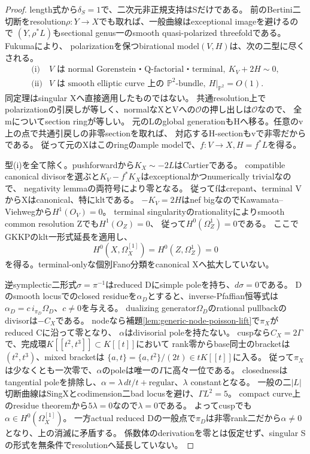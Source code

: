 \documentclass[a4paper,11pt]{ltjsarticle}
\theoremstyle{definition}
\begin{document}
\begin{proof}
length式から$\delta_S=1$で、二次元非正規支持はSだけである。
前のBertini二切断をresolution$\rho:Y\to X$でも取れば、一般曲線はexceptional imageを避けるので
$(Y,\rho^*L)$もsectional genus一のsmooth quasi-polarized threefoldである。
Fukuma\cite[Definition 1, p.75; Proposition 3(iii), p.76]{fukumag1}により、
polarizationを保つbirational model$(V,H)$は、次の二型に尽くされる。
\[
 \begin{array}{ll}
 \text{(i)}&V\text{ は normal Gorenstein・Q-factorial・terminal},\ K_V+2H\sim0,\\
 \text{(ii)}&V\text{ は smooth elliptic curve 上の }\mathbb P^2\text{-bundle},\ H|_{\mathbb P^2}=O(1).
 \end{array}
\]
同定理はsingular Xへ直接適用したものではない。
共通resolution上でpolarizationの引戻しが等しく、normalなXとVへの$\mathcal O$の押し出しは$\mathcal O$なので、
全mについてsection ringが等しい。
元のLのglobal generationもHへ移る。任意のv上の点で共通引戻しの非零sectionを取れば、
対応するH-sectionもvで非零だからである。
従って元のXはこのringのample modelで、$f:V\to X,H=f^*L$を得る。

型(i)を全て除く。pushforwardから$K_X\sim-2L$はCartierである。
compatible canonical divisorを選ぶと$K_V-f^*K_X$はexceptionalかつnumerically trivialなので、
negativity lemmaの両符号により零となる。
従ってfはcrepant、terminal VからXはcanonical、特にkltである。
$-K_V=2H$はnef bigなのでKawamata--Viehwegから$H^1(O_V)=0$。
terminal singularityのrationalityによりsmooth common resolution Zでも$H^1(O_Z)=0$、
従って$H^0(\Omega_Z^1)=0$である。
ここでGKKP\cite[Theorem 1.4, p.3]{gkkp}のklt一形式延長を適用し、
\[
 H^0(X,\Omega_X^{[1]})=H^0(Z,\Omega_Z^1)=0
\]
を得る。terminal-onlyな個別Fano分類をcanonical Xへ拡大していない。

逆symplectic二形式$\sigma=\pi^{-1}$はreduced Dにsimple poleを持ち、$d\sigma=0$である。
Dのsmooth locusでのclosed residueを$\alpha_D$とすると、inverse-Pfaffian恒等式は
$\alpha_D=c\,i_{\pi_D}\Omega_D$、$c\ne0$を与える。
dualizing generator$\Omega_D$のrational pullbackのdivisorは$-C_X$である。
nodeなら補題\ref{lem:generic-node-poisson-lift}で$\pi_X$がreduced Cに沿って零となり、
$\alpha$はdivisorial poleを持たない。
cuspなら$C_X=2\Gamma$で、完成環$K[[t^2,t^3]]\subset K[[t]]$において
rank零からbase同士のbracketは$(t^2,t^3)$、mixed bracketは
$\{a,t\}=\{a,t^2\}/(2t)\in tK[[t]]$に入る。
従って$\pi_X$は少なくとも一次零で、$\alpha$のpoleは唯一の$\Gamma$に高々一位である。
closednessはtangential poleを排除し、$\alpha=\lambda\,dt/t+\text{regular}$、$\lambda$ constantとなる。
一般の二$|L|$切断曲線はSingXとcodimension二bad locusを避け、$\Gamma L^2=5$。
compact curve上のresidue theoremから$5\lambda=0$なので$\lambda=0$である。
よってcuspでも$\alpha\in H^0(\Omega_X^{[1]})$。
一方actual reduced Dの一般点で$\pi_D$は非零rank二だから$\alpha\ne0$となり、上の消滅に矛盾する。
係数体のderivationを零とは仮定せず、singular Sの形式を無条件でresolutionへ延長していない。


\end{proof}
\end{document}
